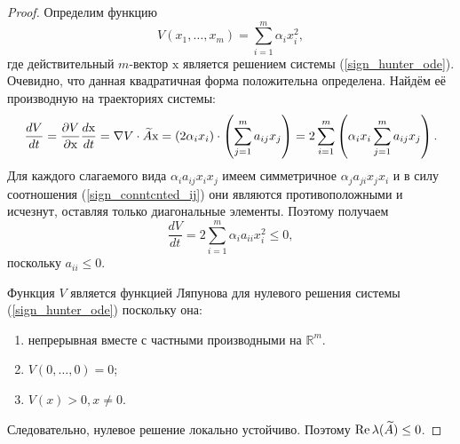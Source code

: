 \begin{proof}
        Определим функцию
        \begin{equation} \label{sign_lyapunov_func}
            V(x_1, \dots, x_m) = \sum_{i=1}^{m} \alpha_i x_i^2,
        \end{equation}
        где действительный \(m\)-вектор \(\mathrm{x}\) является решением системы (\ref{sign_hunter_ode}). Очевидно, что данная квадратичная форма положительна определена. Найдём её производную на траекториях системы:
        \begin{equation}
            \frac{dV}{dt} = \frac{\partial V}{\partial \mathrm{x}} \frac{d \mathrm{x}}{dt} = \nabla V \cdot \widetilde{A} \mathrm{x} = \left( 2 \alpha_i x_i \right) \cdot \left( \sum_{j=1}^{m} a_{ij} x_j \right) = 2 \sum_{i=1}^{m} \left( \alpha_i x_i  \sum_{j=1}^{m} a_{ij} x_j \right).
        \end{equation}
        Для каждого слагаемого вида \(\alpha_i a_{ij} x_i x_j\) имеем симметричное \(\alpha_j a_{ji} x_j x_i\) и в силу соотношения (\ref{sign_conntcnted_ij}) они являются противоположными и исчезнут, оставляя только диагональные элементы. Поэтому получаем
        \begin{equation}
            \frac{dV}{dt} = 2 \sum_{i=1}^{m} \alpha_i a_{ii} x_i^2 \leq 0,
        \end{equation}
        поскольку \(a_{ii} \leq 0\).

        Функция \(V\) является функцией Ляпунова для нулевого решения системы (\ref{sign_hunter_ode}) поскольку она:
        \begin{enumerate}
            \item непрерывная вместе с частными производными на \(\mathbb{R}^m\).
            \item \(V(0, \dots, 0) = 0\);
            \item \( V(x) > 0, x\neq 0 \).
        \end{enumerate}
        Следовательно, нулевое решение локально устойчиво. Поэтому \(\operatorname{Re} \lambda(\widetilde{A}) \leq 0\).
        
    \end{proof}